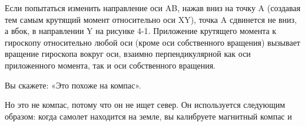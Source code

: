 \documentclass[10pt,oneside]{article}
\newcommand{\TipsSubsection}[1]{\par\vspace{6bp}{\normalsize\bfseries #1\par}\vspace{2bp}}
\begin{document}
Если попытаться изменить направление оси AB, нажав вниз на точку A (создавая тем самым крутящий момент относительно оси XY), точка A сдвинется не вниз, а вбок, в направлении Y на рисунке 4-1. Приложение крутящего момента к гироскопу относительно любой оси (кроме оси собственного вращения) вызывает вращение гироскопа вокруг оси, взаимно перпендикулярной как оси приложенного момента, так и оси собственного вращения.\par

\TipsSubsection{4-2 Курсовой гироскоп Я начну с простейшего возможного применения гироскопа: если он находится в самолете, который меняет курс, ось вращения гироскопа --- установленная, например, горизонтально --- продолжает указывать в одном и том же направлении. Это очень полезно: при любых эволюциях самолета вы можете сохранять направление --- такой прибор называют курсовым гироскопом (см. рис. 4-2).}

Вы скажете: «Это похоже на компас».\par

Но это не компас, потому что он не ищет север. Он используется следующим образом: когда самолет находится на земле, вы калибруете магнитный компас и\par
\end{document}
